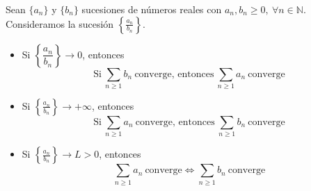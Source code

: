 \begin{coro}
    Sean $\{a_n\}$ y $\{b_n\}$ sucesiones de números reales con $a_n, b_n \geq 0, ~ \forall n \in \mathbb{N}$. Consideramos la sucesión $\left\{ \frac{a_n}{b_n} \right\}$.
    \begin{itemize}
        \item Si $\left\{ \dfrac{a_n}{b_n} \right\} \longrightarrow 0$, entonces
        \begin{equation*}
            \text{Si} ~\displaystyle\sum_{n \geq 1} b_n ~ \text{converge, entonces} ~ \displaystyle\sum_{n \geq 1} a_n ~ \text{converge}
        \end{equation*}

        \item Si $\left\{ \frac{a_n}{b_n} \right\} \longrightarrow +\infty$, entonces
        \begin{equation*}
            \text{Si} ~\displaystyle\sum_{n \geq 1} a_n ~ \text{converge, entonces} ~ \displaystyle\sum_{n \geq 1} b_n ~ \text{converge}
        \end{equation*}

        \item Si $\left\{ \frac{a_n}{b_n} \right\} \longrightarrow L > 0$, entonces
        \begin{equation*}
            \displaystyle\sum_{n \geq 1} a_n ~ \text{converge} \Longleftrightarrow  \displaystyle\sum_{n \geq 1} b_n ~ \text{converge}
        \end{equation*}
    \end{itemize}
\end{coro}

